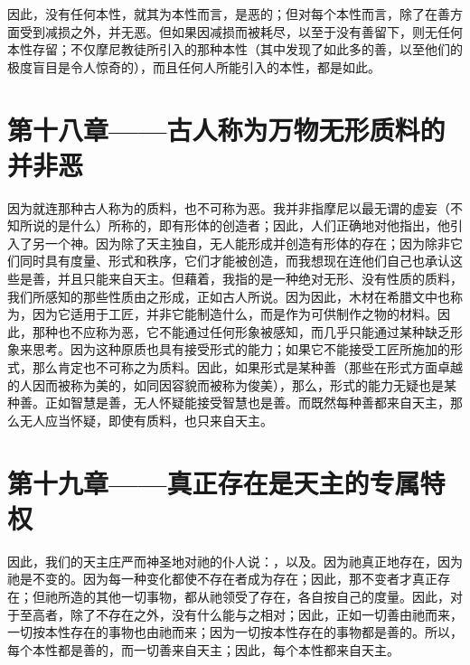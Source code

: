 因此，没有任何本性，就其为本性而言，是恶的；但对每个本性而言，除了在善方面受到减损之外，并无恶。但如果因减损而被耗尽，以至于没有善留下，则无任何本性存留；不仅摩尼教徒所引入的那种本性（其中发现了如此多的善，以至他们的极度盲目是令人惊奇的），而且任何人所能引入的本性，都是如此。\par


\section{第十八章——古人称为万物无形质料的并非恶}

因为就连那种古人称为的质料，也不可称为恶。我并非指摩尼以最无谓的虚妄（不知所说的是什么）所称的，即有形体的创造者；因此，人们正确地对他指出，他引入了另一个神。因为除了天主独自，无人能形成并创造有形体的存在；因为除非它们同时具有度量、形式和秩序，它们才能被创造，而我想现在连他们自己也承认这些是善，并且只能来自天主。但藉着，我指的是一种绝对无形、没有性质的质料，我们所感知的那些性质由之形成，正如古人所说。因为因此，木材在希腊文中也称为，因为它适用于工匠，并非它能制造什么，而是作为可供制作之物的材料。因此，那种也不应称为恶，它不能通过任何形象被感知，而几乎只能通过某种缺乏形象来思考。因为这种原质也具有接受形式的能力；如果它不能接受工匠所施加的形式，那么肯定也不可称之为质料。因此，如果形式是某种善（那些在形式方面卓越的人因而被称为美的，如同因容貌而被称为俊美），那么，形式的能力无疑也是某种善。正如智慧是善，无人怀疑能接受智慧也是善。而既然每种善都来自天主，那么无人应当怀疑，即使有质料，也只来自天主。\par


\section{第十九章——真正存在是天主的专属特权}

因此，我们的天主庄严而神圣地对祂的仆人说：，以及。因为祂真正地存在，因为祂是不变的。因为每一种变化都使不存在者成为存在；因此，那不变者才真正存在；但祂所造的其他一切事物，都从祂领受了存在，各自按自己的度量。因此，对于至高者，除了不存在之外，没有什么能与之相对；因此，正如一切善由祂而来，一切按本性存在的事物也由祂而来；因为一切按本性存在的事物都是善的。所以，每个本性都是善的，而一切善来自天主；因此，每个本性都来自天主。\par

